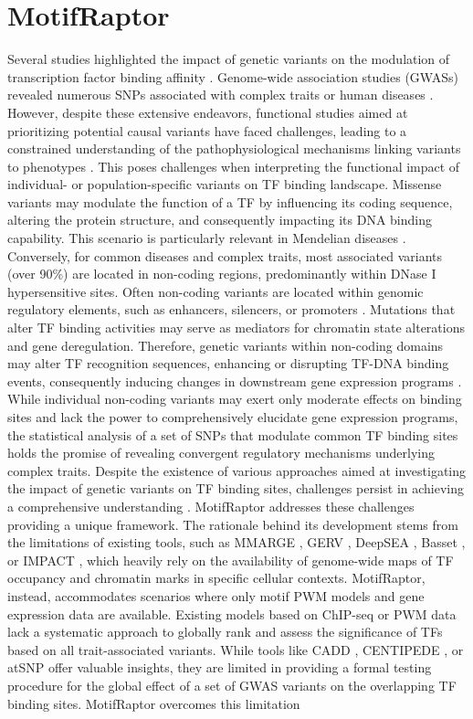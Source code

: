 \documentclass[a4paper, titlepage, openright]{book}
\newcommand{\mychapter}[2]{
    \setcounter{chapter}{#1}
    \setcounter{section}{0}
    \chapter*{#2}
    \addcontentsline{toc}{chapter}{#2}
}
\newcommand{\motifraptor}{MotifRaptor\xspace}
\begin{document}
\mychapter{6}{\motifraptor}
Several studies highlighted the impact of genetic variants on the modulation of transcription factor binding affinity \citep{de2006regulatory, weinhold2014genome, wienert2015editing}. Genome-wide association studies (GWASs) revealed numerous SNPs associated with complex traits or human diseases \citep{buniello2019nhgri}. However, despite these extensive endeavors, functional studies aimed at prioritizing potential causal variants have faced challenges, leading to a constrained understanding of the pathophysiological mechanisms linking variants to phenotypes \citep{gallagher2018post}. This poses challenges when interpreting the functional impact of individual- or population-specific variants on TF binding landscape. Missense variants may modulate the function of a TF by influencing its coding sequence, altering the protein structure, and consequently impacting its DNA binding capability. This scenario is particularly relevant in Mendelian diseases \citep{barrera2016survey}. Conversely, for common diseases and complex traits, most associated variants (over 90\%) are located in non-coding regions, predominantly within DNase I hypersensitive sites. Often non-coding variants are located within genomic regulatory elements, such as enhancers, silencers, or promoters \citep{maurano2012systematic}. Mutations that alter TF binding activities may serve as mediators for chromatin state alterations and gene deregulation. Therefore, genetic variants within non-coding domains may alter TF recognition sequences, enhancing or disrupting TF-DNA binding events, consequently inducing changes in downstream gene expression programs \citep{deplancke2016genetics}. While individual non-coding variants may exert only moderate effects on binding sites and lack the power to comprehensively elucidate gene expression programs, the statistical analysis of a set of SNPs that modulate common TF binding sites holds the promise of revealing convergent regulatory mechanisms underlying complex traits. Despite the existence of various approaches aimed at investigating the impact of genetic variants on TF binding sites, challenges persist in achieving a comprehensive understanding \citep{tognon2023survey}. \motifraptor \citep{yao2021motif} addresses these challenges providing a unique framework. The rationale behind its development stems from the limitations of existing tools, such as MMARGE \citep{link2018mmarge}, GERV \citep{zeng2016gerv}, DeepSEA \citep{zhou2015predicting}, Basset \citep{kelley2016basset}, or IMPACT \citep{amariuta2019impact}, which heavily rely on the availability of genome-wide maps of TF occupancy and chromatin marks in specific cellular contexts. \motifraptor, instead, accommodates scenarios where only motif PWM models and gene expression data are available. Existing models based on ChIP-seq or PWM data lack a systematic approach to globally rank and assess the significance of TFs based on all trait-associated variants. While tools like CADD \citep{maurano2015large}, CENTIPEDE \citep{moyerbrailean2016genetics}, or atSNP \citep{zuo2015atsnp} offer valuable insights, they are limited in providing a formal testing procedure for the global effect of a set of GWAS variants on the overlapping TF binding sites. \motifraptor overcomes this limitation 
\end{document}
